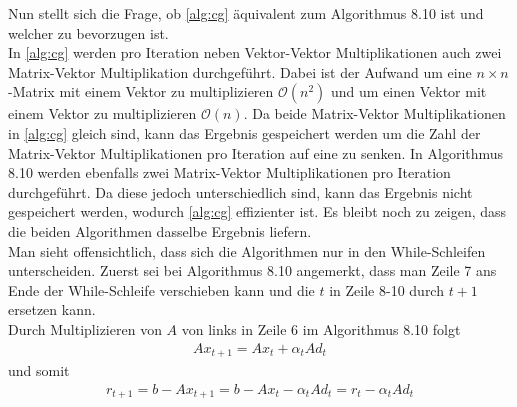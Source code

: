 \documentclass[12pt,a4paper]{scrartcl}
\numberwithin{equation}{section}
\numberwithin{myalgctr}{section}
\numberwithin{mytheoremctr}{subsection}
\numberwithin{mykorollarctr}{subsection}
\numberwithin{mylemmactr}{subsection}
\numberwithin{mybeispielctr}{subsection}
\begin{document}
		
	Nun stellt sich die Frage, ob \cref{alg:cg} äquivalent zum Algorithmus 8.10 \autocite[101]{skript} ist und welcher zu bevorzugen ist.\\
	In \cref{alg:cg} werden pro Iteration neben Vektor-Vektor Multiplikationen auch zwei Matrix-Vektor Multiplikation durchgef\"uhrt. Dabei ist der Aufwand um eine $n\times n$-Matrix mit einem Vektor zu multiplizieren $\mathcal{O}(n^2)$ und um einen Vektor mit einem Vektor zu multiplizieren $\mathcal{O}(n)$. Da beide Matrix-Vektor Multiplikationen in \cref{alg:cg} gleich sind, kann das Ergebnis gespeichert werden um die Zahl der Matrix-Vektor Multiplikationen pro Iteration auf eine zu senken. In Algorithmus 8.10 werden ebenfalls zwei Matrix-Vektor Multiplikationen pro Iteration durchgef\"uhrt. Da diese jedoch unterschiedlich sind, kann das Ergebnis nicht gespeichert werden, wodurch \cref{alg:cg} effizienter ist. Es bleibt noch zu zeigen, dass die beiden Algorithmen dasselbe Ergebnis liefern.\\
	Man sieht offensichtlich, dass sich die Algorithmen nur in den While-Schleifen unterscheiden. Zuerst sei bei Algorithmus 8.10 angemerkt, dass man Zeile 7 ans Ende der While-Schleife verschieben kann und die $t$ in Zeile 8-10 durch $t + 1$ ersetzen kann. \\
	Durch Multiplizieren von $A$ von links in Zeile 6 im Algorithmus 8.10 folgt
	\begin{align*}
		Ax_{t+1} = Ax_t + \alpha_tAd_t
	\end{align*} 
	und somit
	\begin{align}\label{r}
		r_{t+1} = b - Ax_{t+1} = b - Ax_t - \alpha_tAd_t = r_t - \alpha_tAd_t
	\end{align}
	
\end{document}

